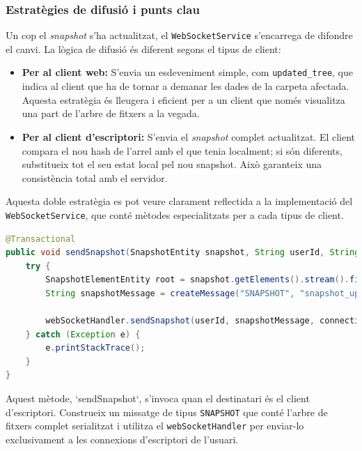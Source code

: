 \subsubsection{Estratègies de difusió i punts clau}

Un cop el \textit{snapshot} s'ha actualitzat, el \texttt{WebSocketService} s'encarrega de difondre el canvi. La lògica de difusió és diferent segons el tipus de client:
\begin{itemize}
    \item \textbf{Per al client web:} S'envia un esdeveniment simple, com \texttt{updated\_tree}, que indica al client que ha de tornar a demanar les dades de la carpeta afectada. Aquesta estratègia és lleugera i eficient per a un client que només visualitza una part de l'arbre de fitxers a la vegada.
    \item \textbf{Per al client d'escriptori:} S'envia el \textit{snapshot} complet actualitzat. El client compara el nou hash de l'arrel amb el que tenia localment; si són diferents, substitueix tot el seu estat local pel nou snapshot. Això garanteix una consistència total amb el servidor.
\end{itemize}

Aquesta doble estratègia es pot veure clarament reflectida a la implementació del \texttt{WebSocketService}, que conté mètodes especialitzats per a cada tipus de client.

\begin{lstlisting}[language=Java, caption={Enviament del snapshot complet al client d'escriptori a `WebSocketService`}]
@Transactional
public void sendSnapshot(SnapshotEntity snapshot, String userId, String connectionId) {
    try {
        SnapshotElementEntity root = snapshot.getElements().stream().filter(element -> element.getParent() == null).findFirst().orElse(null);
        String snapshotMessage = createMessage("SNAPSHOT", "snapshot_update", convertElementToMap(root));
        
        webSocketHandler.sendSnapshot(userId, snapshotMessage, connectionId);
    } catch (Exception e) {
        e.printStackTrace();
    }
}
\end{lstlisting}

Aquest mètode, `sendSnapshot`, s'invoca quan el destinatari és el client d'escriptori. Construeix un missatge de tipus \texttt{SNAPSHOT} que conté l'arbre de fitxers complet serialitzat i utilitza el \texttt{webSocketHandler} per enviar-lo exclusivament a les connexions d'escriptori de l'usuari.

